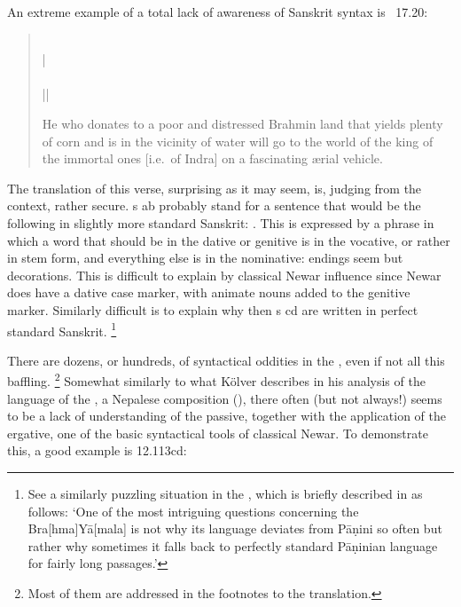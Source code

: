 An extreme example of a total lack of awareness of Sanskrit syntax is
\VSS~17.20:

\begin{quote}
\\
 |\\
\\
 ||

He who donates to a poor and distressed Brahmin land that yields plenty of corn and is in the vicinity of water will go to the world of the king of the immortal ones [i.e.\ of Indra] on a fascinating \ae rial vehicle.
\end{quote}            
            
\noindent            
The translation of this verse, surprising as it may seem, is, judging from the context, rather secure. s ab probably stand for a sentence that would be the following in slightly more standard Sanskrit: . This is expressed by a phrase in which a word that should be in the dative or genitive  is in the vocative, or rather in stem form, and everything else is in the nominative: endings seem but decorations. This is difficult to explain by classical Newar influence since Newar
does have a dative case marker, with animate nouns added to the genitive
marker. Similarly difficult is to explain why then s cd
are written in perfect standard Sanskrit.%
		\footnote{See a similarly puzzling situation in the \BraYa, 
						which is briefly described in  as follows:
		`One of the most intriguing questions concerning the Bra[hma]Yā[mala] 
		is not why its language deviates from Pāṇini so often 
		but rather why sometimes it falls back to perfectly standard 
		Pāṇinian language for fairly long passages.'}

There are dozens, or hundreds, of syntactical oddities in the \VSS,
even if not all this baffling.%
		\footnote{Most of them are addressed in the footnotes 
									to the translation.}
Somewhat similarly to what Kölver describes in 
his analysis of the language of the \SvayP, a Nepalese composition (),
there often (but not always!) seems to be a lack of understanding of the
passive,\label{confusedpassive} 
together with the application of the ergative,\label{ergative} one of the
basic syntactical tools of classical Newar. To demonstrate this, a good 
example is 12.113cd:


